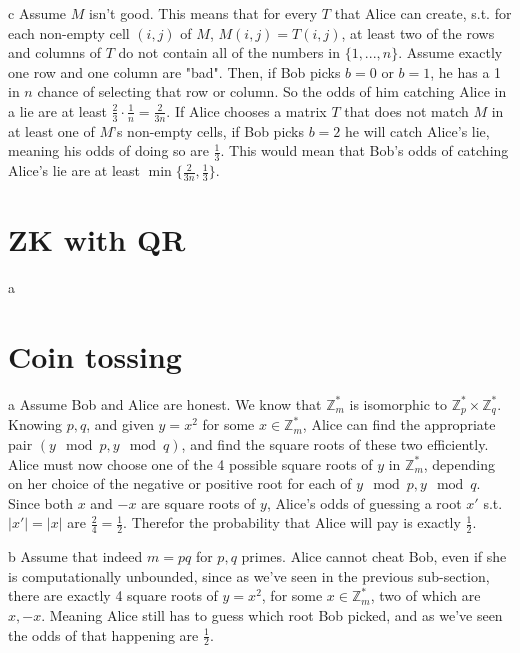 \documentclass{article}
\begin{document}
\begin{paragraph}
    c Assume \(M\) isn't good. This means that for every \(T\) that Alice can create, s.t. for each non-empty cell \((i, j)\) of \(M\), \(M(i, j) = T(i, j)\), at least two of the rows and columns of \(T\) do not contain all of the numbers in \(\{1, ..., n\}\). Assume exactly one row and one column are "bad". Then, if Bob picks \(b = 0\) or \(b = 1\), he has a 1 in \(n\) chance of selecting that row or column. So the odds of him catching Alice in a lie are at least \(\frac{2}{3} \cdot \frac{1}{n} = \frac{2}{3n}\). If Alice chooses a matrix \(T\) that does not match \(M\) in at least one of \(M\)'s non-empty cells, if Bob picks \(b = 2\) he will catch Alice's lie, meaning his odds of doing so are \(\frac{1}{3}\). This would mean that Bob's odds of catching Alice's lie are at least \(\min\{\frac{2}{3n}, \frac{1}{3}\}\).
\end{paragraph}

\section{ZK with QR}
\begin{paragraph}
    a 
\end{paragraph}

\section{Coin tossing}
\begin{paragraph}
    a Assume Bob and Alice are honest. We know that \(\mathbb{Z}^*_m\) is isomorphic to \(\mathbb{Z}^*_p \times \mathbb{Z}^*_q\). Knowing \(p, q\), and given \(y = x^2\) for some \(x \in \mathbb{Z}^*_m\), Alice can find the appropriate pair \((y \mod{p}, y \mod{q})\), and find the square roots of these two efficiently. Alice must now choose one of the 4 possible square roots of \(y\) in \(\mathbb{Z}^*_m\), depending on her choice of the negative or positive root for each of \(y \mod{p}, y \mod{q}\). Since both \(x\) and \(-x\) are square roots of \(y\), Alice's odds of guessing a root \(x'\) s.t. \(|x'| = |x|\) are \(\frac{2}{4} = \frac{1}{2}\). Therefor the probability that Alice will pay is exactly \(\frac{1}{2}\).
\end{paragraph}

\begin{paragraph}
    b Assume that indeed \(m = pq\) for \(p, q\) primes. Alice cannot cheat Bob, even if she is computationally unbounded, since as we've seen in the previous sub-section, there are exactly 4 square roots of \(y = x^2\), for some \(x \in \mathbb{Z}^*_m\), two of which are \(x, -x\). Meaning Alice still has to guess which root Bob picked, and as we've seen the odds of that happening are \(\frac{1}{2}\).
\end{paragraph}
\end{document}
